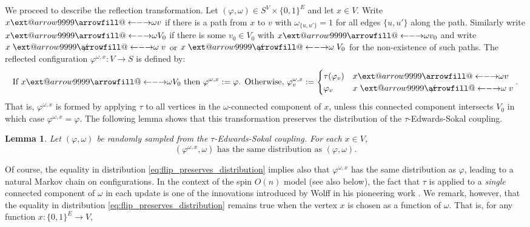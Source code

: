 \documentclass[english]{article}
\makeatletter
\newtheorem{lemma}[counter]{Lemma}
\newcommand\xleftrightarrow[2][]{%
  \ext@arrow 9999{\longleftrightarrowfill@}{#1}{#2}}
\newcommand\longleftrightarrowfill@{%
  \arrowfill@\leftarrow\relbar\rightarrow}
\theoremstyle{plain}
\theoremstyle{plain}
\makeatother
\begin{document}
We proceed to describe the reflection transformation. Let $(\varphi,
\omega)\in S^V\times \{0,1\}^E$ and let $x\in V$. Write $x
\xleftrightarrow{\omega} v$ if there is a path from $x$ to $v$ with
$\omega_{\{u,u'\}} = 1$ for all edges $\{u,u'\}$ along the path.
Similarly write $x \xleftrightarrow{\omega} V_0$ if there is some
$v_0\in V_0$ with $x \xleftrightarrow{\omega} v_0$ and write $x
\centernot{\xleftrightarrow{\omega}} v$ or $x
\centernot{\xleftrightarrow{\omega}} V_0$ for the non-existence of
such paths. The reflected configuration $\varphi^{\omega, x}:V\to S$
is defined by:
\begin{equation}\label{eq:flipped_configuration}
  \text{If $x \xleftrightarrow{\omega} V_0$ then $\varphi^{\omega, x}:=\varphi$. Otherwise, $\varphi^{\omega, x}_v := \begin{cases}
    \tau(\varphi_v)& x
\xleftrightarrow{\omega} v\\
    \varphi_v& x
\centernot{\xleftrightarrow{\omega}} v
  \end{cases}.$}
\end{equation}
That is, $\varphi^{\omega, x}$ is formed by applying $\tau$ to all
vertices in the $\omega$-connected component of $x$, unless this
connected component intersects $V_0$ in which case $\varphi^{\omega,
x} = \varphi$. The following lemma shows that this transformation
preserves the distribution of the $\tau$-Edwards-Sokal coupling.
\begin{lemma}\label{lem:flip_preserves_ES_coupling}
  Let $(\varphi, \omega)$ be randomly sampled from the
  $\tau$-Edwards-Sokal coupling. For each $x\in V$,
  \begin{equation}\label{eq:flip_preserves_distribution}
    (\varphi^{\omega, x}, \omega)\text{ has the same distribution as
    } (\varphi, \omega).
  \end{equation}
\end{lemma}
Of course, the equality in distribution \eqref{eq:flip_preserves_distribution} implies also that $\varphi^{\omega, x}$ has the same distribution as $\varphi$, leading to a natural Markov chain on configurations. In the context of the spin $O(n)$ model (see also below), the fact that $\tau$ is applied to a \emph{single} connected component of $\omega$ in each update is one of the innovations introduced by Wolff in his pioneering work \cite{wolff1989collective}. We remark, however, that the equality in distribution \eqref{eq:flip_preserves_distribution} remains true when the vertex $x$ is chosen as a function of $\omega$. That is, for any function $x:\{0,1\}^E\to V$,
\end{document}
